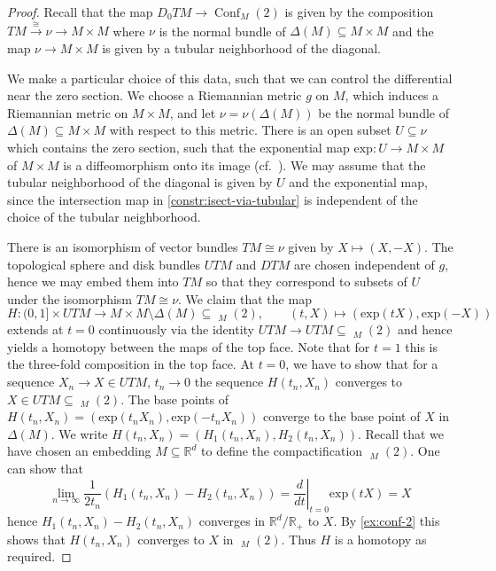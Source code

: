 \documentclass{scrartcl}
\theoremstyle{plain}
\theoremstyle{definition}
\newcommand{\R}{\mathbb R}
\renewcommand{\subset}{\subseteq}
\newcommand{\iso}{\cong}
\let\xto\xrightarrow
\DeclareMathOperator{\Conf}{Conf}
\DeclareMathOperator{\cConf}{\overline{Conf}}
\begin{document}
\begin{proof}
    Recall that the map $D_0TM \to \Conf_M(2)$ is given by the composition $TM\xto{\iso} \nu\to M\times M$ where $\nu$ is the normal bundle of $\Delta(M)\subset M\times M$ and the map $\nu\to M\times M$ is given by a tubular neighborhood of the diagonal. 

We make a particular choice of this data, such that we can control the differential near the zero section. We choose a Riemannian metric $g$ on $M$, which induces a Riemannian metric on $M\times M$, and let $\nu=\nu(\Delta(M))$ be the normal bundle of $\Delta(M)\subset M\times M$ with respect to this metric. There is an open subset $U\subset \nu$ which contains the zero section, such that the exponential map $\mathrm{exp}\colon U\to M\times M$ of $M\times M$ is a diffeomorphism onto its image (cf.\ \cite[Ex. 8-5]{lee2006riemannian}). We may assume that the tubular neighborhood of the diagonal is given by $U$ and the exponential map, since the intersection map in \cref{constr:isect-via-tubular} is independent of the choice of the tubular neighborhood.
   
There is an isomorphism of vector bundles $TM\iso \nu$ given by $X\mapsto (X, -X)$. The topological sphere and disk bundles $UTM$ and $DTM$ are chosen independent of $g$, hence we may embed them into $TM$ so that they correspond to subsets of $U$ under the isomorphism $TM\iso \nu$. We claim that the map 
$$H\colon (0, 1]\times UTM\to M\times M\setminus\Delta(M)\subset\cConf_M(2), \qquad (t, X)\mapsto (\mathrm{exp}(tX), \mathrm{exp}(-X))$$ 
extends at $t=0$ continuously via the identity $UTM\to UTM\subset \cConf_M(2)$ and hence yields a homotopy between the maps of the top face. Note that for $t=1$ this is the three-fold composition in the top face. At $t=0$, we have to show that for a sequence $X_n\to X\in UTM$, $t_n\to 0$ the sequence $H(t_n, X_n)$ converges to $X\in UTM\subset \cConf_M(2)$. The base points of $H(t_n, X_n) = (\mathrm{exp}(t_nX_n), \mathrm{exp}(-t_nX_n))$ converge to the base point of $X$ in $\Delta(M)$.  We write $H(t_n, X_n) = (H_1(t_n, X_n), H_2(t_n, X_n))$. Recall that we have chosen an embedding $M\subset \R^d$ to define the compactification $\cConf_M(2)$. One can show that $$\lim_{n\to\infty} \frac 1 {2t_n} (H_1(t_n, X_n) - H_2(t_n, X_n)) = \left.\frac{d}{dt}\right|_{t=0} \mathrm{exp}(tX) = X$$ hence $H_1(t_n, X_n) - H_2(t_n, X_n)$ converges in $\R^d/\R_+$ to $X$. By \cref{ex:conf-2} this shows that $H(t_n, X_n)$ converges to $X$ in $\cConf_M(2)$. Thus $H$ is a homotopy as required.
\end{proof}
\end{document}
